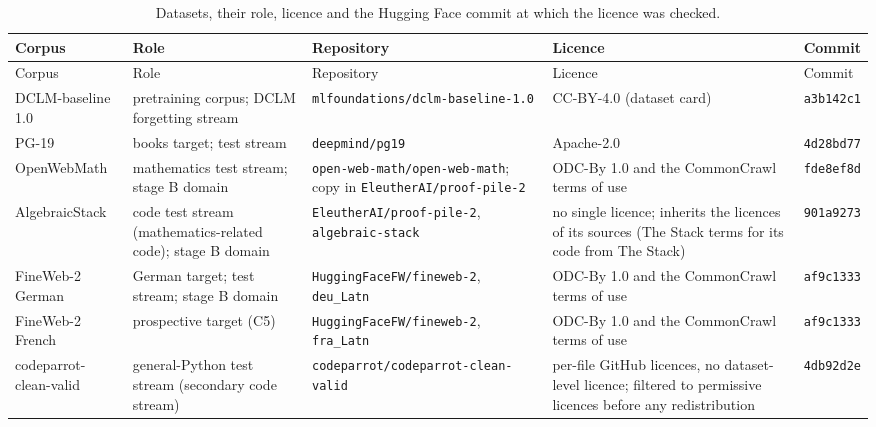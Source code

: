 {\footnotesize\setlength{\tabcolsep}{4pt}
\begin{longtable}{@{}>{\raggedright\arraybackslash}p{2.6cm}>{\raggedright\arraybackslash}p{3.2cm}>{\raggedright\arraybackslash}p{3.7cm}>{\raggedright\arraybackslash}p{3.3cm}>{\raggedright\arraybackslash}p{1.5cm}@{}}
\caption{Datasets, their role, licence and the Hugging Face commit at which the licence was checked.}\label{tab:licences}\\
\toprule
Corpus & Role & Repository & Licence & Commit\\
\midrule
\endfirsthead
\toprule
Corpus & Role & Repository & Licence & Commit\\
\midrule
\endhead
\bottomrule
\endfoot
DCLM-baseline 1.0 \citep{li2024datacomplm} & pretraining corpus; DCLM forgetting stream & \nolinkurl{mlfoundations/dclm-baseline-1.0} & CC-BY-4.0 (dataset card) & \texttt{a3b142c1}\\
PG-19 \citep{rae2019compressive} & books target; test stream & \nolinkurl{deepmind/pg19} & Apache-2.0 & \texttt{4d28bd77}\\
OpenWebMath \citep{paster2023openwebmath} & mathematics test stream; stage B domain & \nolinkurl{open-web-math/open-web-math}; copy in \nolinkurl{EleutherAI/proof-pile-2} & ODC-By 1.0 and the CommonCrawl terms of use & \texttt{fde8ef8d}\\
AlgebraicStack \citep{azerbayev2024llemma} & code test stream (mathematics-related code); stage B domain & \nolinkurl{EleutherAI/proof-pile-2}, \nolinkurl{algebraic-stack} & no single licence; inherits the licences of its sources (The Stack terms for its code from The Stack) & \texttt{901a9273}\\
FineWeb-2 German \citep{penedo2025fineweb2} & German target; test stream; stage B domain & \nolinkurl{HuggingFaceFW/fineweb-2}, \nolinkurl{deu_Latn} & ODC-By 1.0 and the CommonCrawl terms of use & \texttt{af9c1333}\\
FineWeb-2 French \citep{penedo2025fineweb2} & prospective target (C5) & \nolinkurl{HuggingFaceFW/fineweb-2}, \nolinkurl{fra_Latn} & ODC-By 1.0 and the CommonCrawl terms of use & \texttt{af9c1333}\\
codeparrot-clean-valid \citep{hfcodeparrotvalid} & general-Python test stream (secondary code stream) & \nolinkurl{codeparrot/codeparrot-clean-valid} & per-file GitHub licences, no dataset-level licence; filtered to permissive licences before any redistribution & \texttt{4db92d2e}\\
\end{longtable}}
